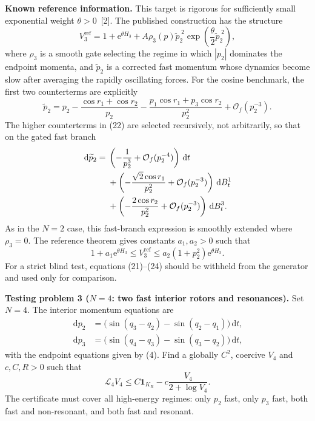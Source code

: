 \documentclass[11pt]{article}
\newcommand{\1}{\mathbf{1}}
\newcommand{\cL}{\mathcal{L}}
\newcommand{\cO}{\mathcal{O}}
\newcommand{\ee}{\mathrm{e}}
\newcommand{\dd}{\,\mathrm{d}}
\newcommand{\wt}[1]{\widetilde{#1}}
\begin{document}
\medskip
\noindent\textbf{Known reference information.}
This target is rigorous for sufficiently small exponential weight $\theta>0$~[2]. The published construction has the structure
\begin{equation}
V_3^{\mathrm{ref}}=1+\ee^{\theta H_3}
+A\rho_3(p)\wt p_2^{\;2}\exp\!\left(\frac\theta2\wt p_2^{\;2}\right),
\end{equation}
where $\rho_3$ is a smooth gate selecting the regime in which $|p_2|$ dominates the endpoint momenta, and $\wt p_2$ is a corrected fast momentum whose dynamics become slow after averaging the rapidly oscillating forces. For the cosine benchmark, the first two counterterms are explicitly
\begin{equation}
\wt p_2=p_2-\frac{\cos r_1+\cos r_2}{p_2}
-\frac{p_1\cos r_1+p_3\cos r_2}{p_2^2}+\cO_f(p_2^{-3}).
\end{equation}
The higher counterterms in (22) are selected recursively, not arbitrarily, so that on the gated fast branch
\begin{align}
\dd\wt p_2={}&\left(-\frac1{p_2^3}+\cO_f(p_2^{-4})\right)\dd t\notag\\
&+\left(-\frac{\sqrt2\cos r_1}{p_2^2}+\cO_f(p_2^{-3})\right)\dd B_t^1\notag\\
&+\left(-\frac{2\cos r_2}{p_2^2}+\cO_f(p_2^{-3})\right)\dd B_t^3.
\end{align}
As in the $N=2$ case, this fast-branch expression is smoothly extended where $\rho_3=0$. The reference theorem gives constants $a_1,a_2>0$ such that
\begin{equation}
1+a_1\ee^{\theta H_3}\le V_3^{\mathrm{ref}}\le a_2(1+p_2^2)\ee^{\theta H_3}.
\end{equation}
For a strict blind test, equations (21)--(24) should be withheld from the generator and used only for comparison.

\medskip
\noindent\textbf{Testing problem 3 ($N=4$: two fast interior rotors and resonances).}
Set $N=4$. The interior momentum equations are
\begin{align*}
\dd p_2&=\bigl(\sin(q_3-q_2)-\sin(q_2-q_1)\bigr)\dd t,\\
\dd p_3&=\bigl(\sin(q_4-q_3)-\sin(q_3-q_2)\bigr)\dd t,
\end{align*}
with the endpoint equations given by (4). Find a globally $C^2$, coercive $V_4$ and $c,C,R>0$ such that
\begin{equation}
\cL_4V_4\le C\1_{K_R}-c\frac{V_4}{2+\log V_4}.
\end{equation}
The certificate must cover all high-energy regimes: only $p_2$ fast, only $p_3$ fast, both fast and non-resonant, and both fast and resonant.
\end{document}
